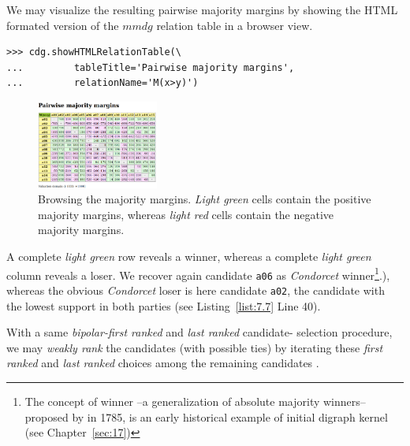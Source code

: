 We may visualize the resulting pairwise majority margins by showing the HTML formated version of the $mmdg$ relation table in a browser view.
\begin{lstlisting}
>>> cdg.showHTMLRelationTable(\
...         tableTitle='Pairwise majority margins',
...         relationName='M(x>y)')
\end{lstlisting}
\begin{figure}[h]
\sidecaption[t]
\includegraphics[width=4cm]{Figures/7-4-majorityMargins.png}
\caption{Browsing the majority margins. \emph{Light green} cells contain the positive majority margins, whereas \emph{light red} cells contain the negative majority margins.}
\label{fig:7.4}       %
\end{figure}

A complete \emph{light green} row reveals a \Condorcet winner, whereas a complete \emph{light green} column reveals a \Condorcet loser. We recover again candidate \texttt{a06} as \emph{Condorcet} winner\footnote{The concept of \Condorcet winner --a generalization of absolute majority winners-- proposed by \Condorcet in 1785, is an early historical example of initial digraph kernel (see Chapter~\vref{sec:17})}.), whereas the obvious \emph{Condorcet} loser is here candidate \texttt{a02}, the candidate with the lowest support in both parties (see Listing~\vref{list:7.7} Line 40).

With a same \emph{bipolar-first ranked} and \emph{last ranked} candidate- selection procedure, we may \emph{weakly rank} the candidates (with possible ties) by iterating these \emph{first ranked} and \emph{last ranked} choices among the remaining candidates \citep{BIS-1999}.

